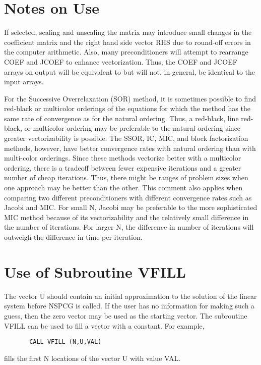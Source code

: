 \newpage
\section{Notes on Use}
\label{notes}
\indent
 
   If selected, scaling and unscaling the matrix may introduce 
small changes in the coefficient matrix and the right hand side 
vector RHS due to round-off errors in the computer arithmetic.  
Also, many preconditioners will attempt to rearrange COEF and 
JCOEF to enhance vectorization.  Thus, the COEF and JCOEF arrays
on output will be equivalent to but will not, in general,
be identical to the input arrays.
 
 
   For the Successive Overrelaxation (SOR) method, it is sometimes
possible to find red-black or multicolor orderings of the equations
for which the method has the same rate of convergence as for
the natural ordering.  Thus,
a red-black, line red-black, or multicolor ordering may be
preferable to the natural ordering since greater vectorizability
is possible.  The SSOR, IC, MIC, and block factorization methods,
however, have better convergence rates with natural ordering than
with multi-color orderings.  Since these methods vectorize better
with a multicolor ordering, there is a tradeoff between fewer
expensive iterations and a greater number of cheap iterations.  
Thus, there
might be ranges of problem sizes when one approach may be better
than the other.  This comment also applies when comparing two
different preconditioners with different convergence rates such
as Jacobi and MIC.  For small N, Jacobi may be preferable to the
more sophisticated MIC method because of its vectorizability and
the relatively small difference in the number of iterations.  For
larger N, the difference in number of iterations will outweigh
the difference in time per iteration.
 
\newpage
\section{Use of Subroutine VFILL}
\label{vfill}
\indent
 
    The vector U should contain an initial approximation to the
solution of the linear system before NSPCG is called.  If the user
has no information for making such a guess, then the zero vector
may be used as the starting vector.  The subroutine VFILL can be
used to fill a vector with a constant.  For example,
\begin{verbatim}
       CALL VFILL (N,U,VAL) 
\end{verbatim}
fills the first N locations of the vector U with value VAL.
 
